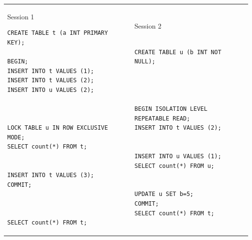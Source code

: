 \documentclass[10pt]{article}
\theoremstyle{definition}
\begin{document}
\newpage
\begin{tcolorbox}
\begin{tabular}{p{3.25in}p{3in}}
\hspace{-0.2in}Session 1
\begin{lstlisting}
CREATE TABLE t (a INT PRIMARY KEY);

BEGIN;
INSERT INTO t VALUES (1);
INSERT INTO t VALUES (2);
INSERT INTO u VALUES (2);



LOCK TABLE u IN ROW EXCLUSIVE MODE;
SELECT count(*) FROM t;


INSERT INTO t VALUES (3);
COMMIT;



SELECT count(*) FROM t;
\end{lstlisting}
    &
\hspace{-0.2in}Session 2
\begin{lstlisting}

CREATE TABLE u (b INT NOT NULL);




BEGIN ISOLATION LEVEL
REPEATABLE READ;
INSERT INTO t VALUES (2);


INSERT INTO u VALUES (1);
SELECT count(*) FROM u;


UPDATE u SET b=5;
COMMIT;
SELECT count(*) FROM t;

\end{lstlisting}
\end{tabular}
\vspace{-0.2in}
\end{tcolorbox}
\vspace{0.25in}
\end{document}
